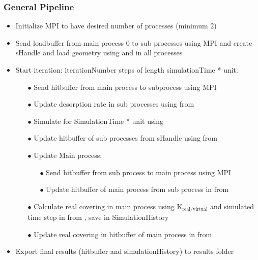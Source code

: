 \subsubsection{General Pipeline}
\begin{itemize}[noitemsep,topsep=0pt]
\item Initialize MPI to have desired number of processes (minimum 2)
\item Send loadbuffer from main process 0 to sub processes using MPI and create sHandle and load geometry using  and  in all processes
\item Start iteration: iterationNumber steps of length simulationTime * unit:
	\begin{itemize}[noitemsep,topsep=0pt]
	\item[$\bullet$] Send hitbuffer from main process to subprocess using MPI
	\item[$\bullet$] Update desorption rate in sub processes using  from 
	\item[$\bullet$] Simulate for SimulationTime * unit using 
	\item[$\bullet$] Update hitbuffer of sub processes from sHandle using  from 
	\item[$\bullet$] Update Main process:
		\begin{itemize}[noitemsep,topsep=0pt]
		\item[$\bullet$] Send hitbuffer from sub process to main process using MPI
		\item[$\bullet$] Update hitbuffer of main process from sub process in  from 
		\end{itemize}
	\item[$\bullet$] Calculate real covering in main process using $\text{K}_{\text{real}/\text{virtual}}$ and simulated time step in  from , save in SimulationHistory
	\item[$\bullet$] Update real covering in hitbuffer of main process in  from 
	\end{itemize}
\item Export final results (hitbuffer and simulationHistory) to results folder
\end{itemize}

